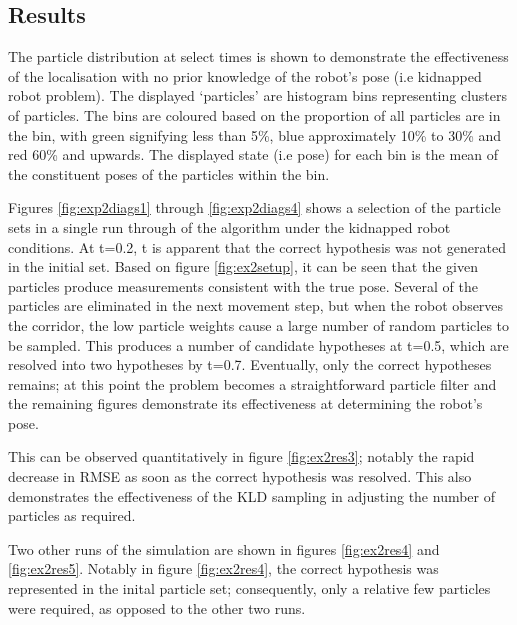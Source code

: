 \documentclass[english]{article}
\begin{document}
\subsection{Results}
The particle distribution at select times is shown to demonstrate the effectiveness of the localisation with no prior knowledge of the robot's pose (i.e kidnapped robot problem). The displayed `particles' are histogram bins representing clusters of particles. The bins are coloured based on the proportion of all particles are in the bin, with green signifying less than 5\%, blue approximately 10\% to 30\% and red 60\% and upwards. The displayed state (i.e pose) for each bin is the mean of the constituent poses of the particles within the bin.

Figures \ref{fig:exp2diags1} through \ref{fig:exp2diags4} shows a selection of the particle sets in a single run through of the algorithm under the kidnapped robot conditions. At t=0.2, t is apparent that the correct hypothesis was not generated in the initial set. Based on figure \ref{fig:ex2setup}, it can be seen that the given particles produce measurements consistent with the true pose. Several of the particles are eliminated in the next movement step, but when the robot observes the corridor, the low particle weights cause a large number of random particles to be sampled. This produces a number of candidate hypotheses at t=0.5, which are resolved into two hypotheses by t=0.7. Eventually, only the correct hypotheses remains; at this point the problem becomes a straightforward particle filter and the remaining figures demonstrate its effectiveness at determining the robot's pose.

This can be observed quantitatively in figure \ref{fig:ex2res3}; notably the rapid decrease in RMSE as soon as the correct hypothesis was resolved. This also demonstrates the effectiveness of the KLD sampling in adjusting the number of particles as required.

Two other runs of the simulation are shown in figures \ref{fig:ex2res4} and \ref{fig:ex2res5}. Notably in figure \ref{fig:ex2res4}, the correct hypothesis was represented in the inital particle set; consequently, only a relative few particles were required, as opposed to the other two runs.
\end{document}

